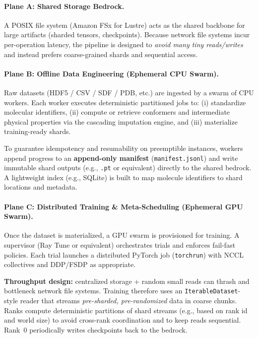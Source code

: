 \documentclass[10pt]{article}
\begin{document}
\paragraph{Plane A: Shared Storage Bedrock.}
A POSIX file system (Amazon FSx for Lustre) acts as the shared backbone for large artifacts (sharded tensors, checkpoints). Because network file systems incur per-operation latency, the pipeline is designed to \emph{avoid many tiny reads/writes} and instead prefers coarse-grained shards and sequential access.

\paragraph{Plane B: Offline Data Engineering (Ephemeral CPU Swarm).}
Raw datasets (HDF5 / CSV / SDF / PDB, etc.) are ingested by a swarm of CPU workers. Each worker executes deterministic partitioned jobs to: (i) standardize molecular identifiers, (ii) compute or retrieve conformers and intermediate physical properties via the cascading imputation engine, and (iii) materialize training-ready shards.

To guarantee idempotency and resumability on preemptible instances, workers append progress to an \textbf{append-only manifest} (\texttt{manifest.jsonl}) and write immutable shard outputs (e.g., \texttt{.pt} or equivalent) directly to the shared bedrock. A lightweight index (e.g., SQLite) is built to map molecule identifiers to shard locations and metadata.

\paragraph{Plane C: Distributed Training \& Meta-Scheduling (Ephemeral GPU Swarm).}
Once the dataset is materialized, a GPU swarm is provisioned for training. A supervisor (Ray Tune or equivalent) orchestrates trials and enforces fail-fast policies. Each trial launches a distributed PyTorch job (\texttt{torchrun}) with NCCL collectives and DDP/FSDP as appropriate.

\textbf{Throughput design:} centralized storage + random small reads can thrash and bottleneck network file systems. Training therefore uses an \texttt{IterableDataset}-style reader that streams \emph{pre-sharded, pre-randomized} data in coarse chunks. Ranks compute deterministic partitions of shard streams (e.g., based on rank id and world size) to avoid cross-rank coordination and to keep reads sequential. Rank~0 periodically writes checkpoints back to the bedrock.
\end{document}
